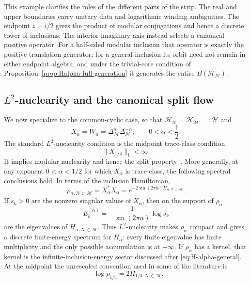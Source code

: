 \documentclass[a4paper,11pt]{article}
\theoremstyle{definition}
\newcommand{\mN}{\mathcal{N}}
\newcommand{\mH}{\mathcal{H}}
\newcommand{\mM}{\mathcal{M}}
\begin{document}
This example clarifies the roles of the different parts of the strip. The
real and upper boundaries carry unitary data and logarithmic winding
ambiguities. The endpoint $z=i/2$ gives the product of modular conjugations
and hence a discrete tower of inclusions. The interior imaginary axis instead
selects a canonical positive operator. For a half-sided modular inclusion
that operator is exactly the positive translation generator; for a general
inclusion its orbit need not remain in either endpoint algebra, and under the
trivial-core condition of
Proposition~\ref{prop:Halpha-full-generation} it generates the entire
$B(\mH_{\mN})$.

\subsection{\texorpdfstring{$L^2$}{L2}-nuclearity and the canonical split flow}
\label{sec:nuclearity}

We now specialize to the common-cyclic case, so that
$\mH_{\mN}=\mH_{\mM}=: \mathcal H$ and
\begin{equation}
    X_\alpha=W_\alpha
    =\overline{\Delta_{\mM}^\alpha\Delta_{\mN}^{-\alpha}},
    \qquad 0<\alpha<\frac12 .
\end{equation}
The standard $L^2$-nuclearity condition is the midpoint trace-class condition
\begin{equation}
    \boxed{\|X_{1/4}\|_1<\infty .}
    \label{eq:L2-nuclearity-alpha}
\end{equation}
It implies modular nuclearity and hence the split property~\cite{BDL2007}. More generally, at any exponent $0<\alpha<1/2$ for which $X_\alpha$ is trace class, the following spectral conclusions hold. In terms of the inclusion Hamiltonian,
\begin{equation}
    \rho_{\alpha,\mN\subset\mM}
    =X_\alpha^*X_\alpha
    =e^{-2\sin(2\pi\alpha)H_{\alpha,\mN\subset\mM}}.
    \label{eq:rho-inclusion-vs-split}
\end{equation}
If $s_k>0$ are the nonzero singular values of $X_\alpha$, then on the support
of $\rho_\alpha$
\begin{equation}
    E_k^{(\alpha)}
    =-\frac{1}{\sin(2\pi\alpha)}\log s_k
\end{equation}
are the eigenvalues of $H_{\alpha,\mN\subset\mM}$. Thus $L^2$-nuclearity makes
$\rho_\alpha$ compact and gives a discrete finite-energy spectrum for
$H_\alpha$: every finite eigenvalue has finite multiplicity and the only
possible accumulation is at $+\infty$. If $\rho_\alpha$ has a kernel, that
kernel is the infinite-inclusion-energy sector discussed after
\eqref{eq:H-alpha-general}. At the midpoint the unrescaled convention used in
some of the literature is
\begin{equation}
    -\log\rho_{1/4}=2H_{1/4,\mN\subset\mM}.
\end{equation}
\end{document}
